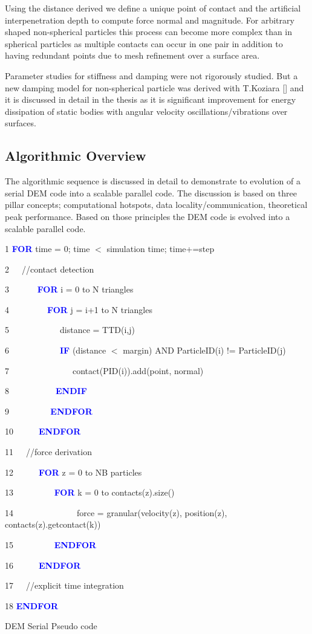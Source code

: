 \documentclass[times,12pt]{article}
\begin{document}
Using the distance derived we define a unique point of contact and the artificial interpenetration depth to compute force normal and magnitude. For arbitrary shaped non-spherical particles this process can become more complex than in spherical particles as multiple contacts can occur in one pair in addition to having redundant points due to mesh refinement over a surface area. 
    
Parameter studies for stiffness and damping were not rigorously studied. But a new damping model for non-spherical particle was derived with T.Koziara [] and it is discussed in detail in the thesis as it is significant improvement for energy dissipation of static bodies with angular velocity oscillations/vibrations over surfaces.   


\subsection{Algorithmic Overview}

The algorithmic sequence is discussed in detail to demonstrate to evolution of a serial DEM code into a scalable parallel code. The discussion is based on three pillar concepts; computational hotspots, data locality/communication, theoretical peak performance. Based on those principles the DEM code is evolved into a scalable parallel code.
 
\begin{algorithm}	

1 \textbf{\textcolor{blue}{FOR}} time = 0; time $<$ simulation time; time+=step

2~~~//contact detection
		
3~~~~~~	\textbf{\textcolor{blue}{FOR}} i = 0 to N triangles

4~~~~~~~~~\textbf{\textcolor{blue}{FOR}} j = i+1 to N triangles
				
5~~~~~~~~~~~~distance = TTD(i,j)
				
6~~~~~~~~~~~~\textbf{\textcolor{blue}{IF}} (distance $<$ margin) AND ParticleID(i) != ParticleID(j)

7~~~~~~~~~~~~~~~contact(PID(i)).add(point, normal)

8~~~~~~~~~~~\textbf{\textcolor{blue}{ENDIF}}
			
9~~~~~~~~~\textbf{\textcolor{blue}{	ENDFOR}}
			
10~~~~~~\textbf{\textcolor{blue}{ENDFOR}}

11~~~//force derivation
		
12~~~~~~\textbf{\textcolor{blue}{FOR}} z = 0 to NB particles

13~~~~~~~~~	\textbf{\textcolor{blue}{FOR}} k = 0 to contacts(z).size()

14~~~~~~~~~~~~~~~force = granular(velocity(z), position(z), contacts(z).getcontact(k))

15~~~~~~~~~	\textbf{\textcolor{blue}{ENDFOR}}

16~~~~~~\textbf{\textcolor{blue}{ENDFOR}}
	
17~~~//explicit time integration

18 \textbf{\textcolor{blue}{ENDFOR}}

\protect\caption{\label{algorithmPseudo}DEM Serial Pseudo code}
\end{algorithm}
\end{document}
